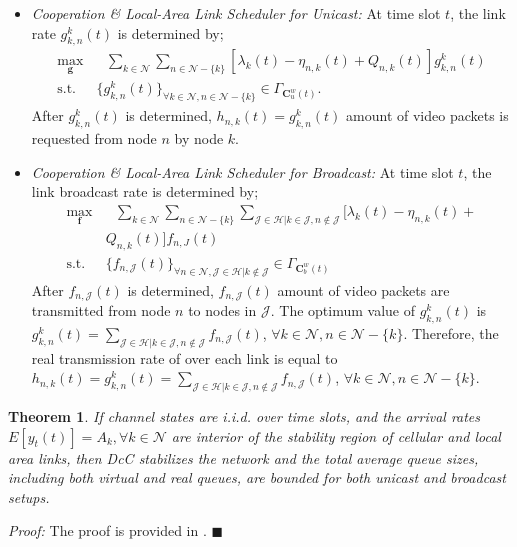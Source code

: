 \documentclass[conference]{IEEEtran}
\newtheorem{theorem}{Theorem}
\newcommand{\Jset}{\mathcal{J}}
\newcommand{\Nset}{\mathcal{N}}
\newcommand{\Hset}{\mathcal{H}}
\begin{document}
\begin{itemize}
 \item {\em Cooperation \& Local-Area Link Scheduler for Unicast:} At time slot $t$, the link rate ${g}_{k,n}^{k}(t)$ is determined by;
\begin{align} \label{eq:local_area_scheduling_unicast}
 \max_{\boldsymbol {{g}}} & \mbox{  }  \sum_{k \in \Nset} \sum_{n \in \Nset-\{k\}} [{\lambda}_{k}(t) - {\eta}_{n,k}(t) + Q_{n,k}(t) ]  {g}_{k,n}^{k}(t)   \nonumber \\
\mbox{s.t.} \mbox{ }  & \{{g}_{k,n}^{k}(t)\}_{\forall k \in \Nset, n \in \Nset -\{k\}} \in \Gamma_{\boldsymbol C_{u}^{w}(t)}.
\end{align} After ${g}_{k,n}^{k}(t)$ is determined, ${h}_{n,k}(t) = {g}_{k,n}^{k}(t)$ amount of video packets is requested from node $n$ by node $k$.

 \item {\em Cooperation \& Local-Area Link Scheduler for Broadcast:}
At time slot $t$, the link broadcast rate is determined by;
\begin{align} \label{eq:local_area_scheduling_broadcast}
 \max_{\boldsymbol {{f}}} & \mbox{  }  \sum_{k \in \Nset} \sum_{n \in \Nset-\{k\}} \sum_{\Jset \in \Hset | k \in \Jset, n \notin \Jset}  [{\lambda}_{k}(t) - {\eta}_{n,k}(t) + \nonumber \\
& Q_{n,k}(t) ] {f}_{n,J}(t)   \nonumber \\
\mbox{s.t.} \mbox{ }  & \{{f}_{n,\Jset}(t)\}_{\forall n \in \Nset, \Jset \in \Hset | k \notin \Jset} \in \Gamma_{\boldsymbol C_{b}^{w}(t)}
\end{align}
After ${f}_{n,\Jset}(t)$ is determined, ${f}_{n,\Jset}(t)$ amount of video packets are transmitted from node $n$ to nodes in $\Jset$. The optimum value of ${g}_{k,n}^{k}(t)$ is ${g}_{k,n}^{k}(t) = \sum_{\Jset \in \Hset | k \in \Jset, n \notin \Jset} f_{n,\Jset}(t)$, $\forall k \in \Nset, n \in \Nset - \{k\} $. Therefore, the real transmission rate of over each link is equal to
${h}_{n,k}(t) = {g}_{k,n}^{k}(t) = \sum_{\Jset \in \Hset | k \in \Jset, n \notin \Jset} f_{n,\Jset}(t)$, $\forall k \in \Nset, n \in \Nset - \{k\} $.

\end{itemize}

\begin{theorem}\label{eec_theorem1}
If channel states are i.i.d. over time slots, and the arrival rates $E[y_{t}(t)] = A_k, \forall k \in \Nset$ are interior of the stability region of cellular and local area links, then DcC stabilizes the network and the total average queue sizes, including both virtual and real queues, are bounded for both unicast and broadcast setups.
\end{theorem}
{\em Proof:} The proof is provided in \cite{thisTechRep}.
$\blacksquare$
\end{document}
